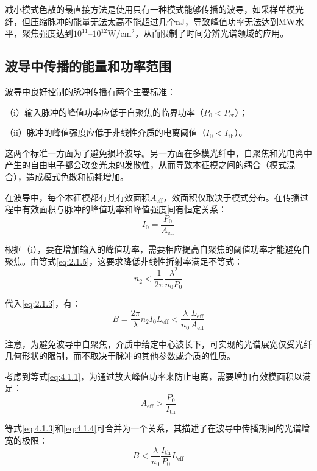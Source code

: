 \documentclass[14pt,a4paper,oneside]{article}
\numberwithin{equation}{subsection}             %
\numberwithin{figure}{subsection}               %
\begin{document}
减小模式色散的最直接方法是使用只有一种模式能够传播的波导，如采样单模光纤，但压缩脉冲的能量无法太高不能超过几个nJ，导致峰值功率无法达到MW水平，聚焦强度达到$10^{11}–10^{12} \mathrm{W/cm^2}$，从而限制了时间分辨光谱领域的应用。

\subsection{波导中传播的能量和功率范围}

波导中良好控制的脉冲传播有两个主要标准\cite{vozziOptimalSpectralBroadening2005}：

（i）输入脉冲的峰值功率应低于自聚焦的临界功率（$P_0<P_{\mathrm{cr}}$）；

（ii）脉冲的峰值强度应低于非线性介质的电离阈值（$I_0<I_{\mathrm{th}}$）。

这两个标准一方面为了避免损坏波导。另一方面在多模光纤中，自聚焦和光电离中产生的自由电子都会改变光束的发散性，从而导致本征模之间的耦合（模式混合），造成模式色散和损耗增加。

在波导中，每个本征模都有其有效面积$A_{\mathrm{eff}}$，效面积仅取决于模式分布。在传播过程中有效面积与脉冲的峰值功率和峰值强度间有恒定关系：
\begin{equation}
    I_0=\frac{P_0}{A_{\mathrm{eff}}}
    \label{eq:4.1.1}
\end{equation}

根据（i），要在增加输入的峰值功率，需要相应提高自聚焦的阈值功率才能避免自聚焦。由等式\ref{eq:2.1.5}，这要求降低非线性折射率满足不等式：
\begin{equation}
    n_2<\frac1{2\pi}\frac{\lambda^2}{n_0P_0}
    \label{eq:4.1.2}
\end{equation}

代入\ref{eq:2.1.3}，有：
\begin{equation}
    B=\frac{2\pi}\lambda n_2I_0L_{\mathrm{eff}}<\frac\lambda{n_0}\frac{L_{\mathrm{eff}}}{A_{\mathrm{eff}}}
    \label{eq:4.1.3}
\end{equation}

注意，为避免波导中自聚焦，介质中给定中心波长下，可实现的光谱展宽仅受光纤几何形状的限制，而不取决于脉冲的其他参数或介质的性质。

考虑到等式\ref{eq:4.1.1}，为通过放大峰值功率来防止电离，需要增加有效模面积以满足：
\begin{equation}
    A_{\mathrm{eff}}>\frac{P_0}{I_{\mathrm{th}}}
    \label{eq:4.1.4}
\end{equation}

等式\ref{eq:4.1.3}和\ref{eq:4.1.4}可合并为一个关系，其描述了在波导中传播期间的光谱增宽的极限：
\begin{equation}
    B<\frac\lambda{n_0}\frac{I_{\mathrm{th}}}{P_0}L_{\mathrm{eff}}
    \label{eq:4.1.5}
\end{equation}
\end{document}
